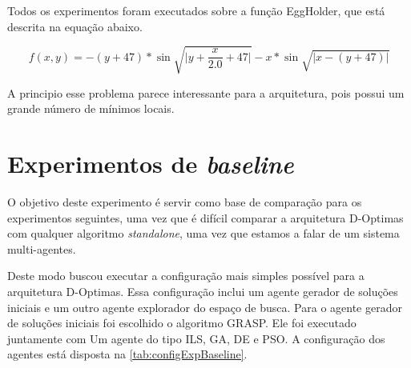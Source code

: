 Todos os experimentos foram executados sobre a função EggHolder, que está descrita na equação abaixo. 

\begin{equation*}
  f(x, y) = -(y + 47) * \sin{\sqrt{\big| y + \frac{x}{2.0} + 47 \big| }} - x * \sin{\sqrt{\big|x - (y + 47)\big|}} 
\end{equation*}

A principio esse problema parece interessante para a arquitetura, pois possui um grande número de mínimos locais. 

\section{Experimentos de \textit{baseline}}
\label{sec:baseline}
O objetivo deste experimento é servir como base de comparação para os experimentos seguintes, uma vez que é difícil comparar a arquitetura D-Optimas com qualquer algoritmo \textit{standalone}, uma vez que estamos a falar de um sistema multi-agentes.

Deste modo buscou executar a configuração mais simples possível para a arquitetura D-Optimas. Essa configuração inclui um agente gerador de soluções iniciais e um outro agente explorador do espaço de busca. Para o agente gerador de soluções iniciais foi escolhido o algoritmo GRASP. Ele foi executado juntamente com Um agente do tipo ILS, GA, DE e PSO. 
A configuração dos agentes está disposta na \autoref{tab:configExpBaseline}.

